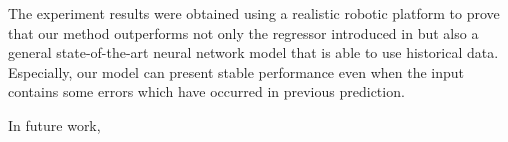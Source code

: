 \documentclass[letterpaper, 10 pt, conference]{ieeeconf}  %
\begin{document}
	The experiment results were obtained using a realistic robotic platform to prove 
	that our method outperforms not only the regressor
	introduced in \cite{Choi17} but also a general state-of-the-art neural network 
	model that is able to use historical data. Especially, our model can present 
	stable performance even when the input contains some errors which have occurred in 
	previous prediction. 
	  
	
	In future work, 
	
	
{\small
	
	
}
\end{document}
